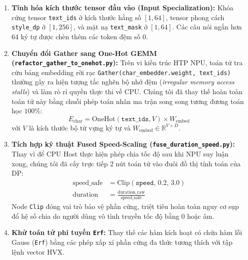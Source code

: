 \documentclass[11pt,a4paper,oneside,table]{report}
\begin{document}
\begin{enumerate}
    \item \textbf{Tĩnh hóa kích thước tensor đầu vào (Input Specialization):}
    Khóa cứng tensor \texttt{text\_ids} ở kích thước hằng số $[1, 64]$, tensor phong cách \texttt{style\_dp} ở $[1, 256]$, và mặt nạ \texttt{text\_mask} ở $[1, 64]$. Các câu nói ngắn hơn 64 ký tự được chèn thêm các token đệm số 0.
    
    \item \textbf{Chuyển đổi Gather sang One-Hot GEMM (\texttt{refactor\_gather\_to\_onehot.py}):}
    Trên vi kiến trúc HTP NPU, toán tử tra cứu bảng embedding rời rạc \texttt{Gather(char\_embedder.weight, text\_ids)} thường gây ra hiện tượng tắc nghẽn bộ nhớ đệm (\textit{irregular memory access stalls}) và làm rò rỉ quyền thực thi về CPU. Chúng tôi đã thay thế hoàn toàn toán tử này bằng chuỗi phép toán nhân ma trận song song tương đương toán học $100\%$:
    \begin{equation}
        E_{\text{char}} = \text{OneHot}(\texttt{text\_ids}, V) \times W_{\text{embed}}
    \end{equation}
    với $V$ là kích thước bộ từ vựng ký tự và $W_{\text{embed}} \in \mathbb{R}^{V \times D}$.
    
    \item \textbf{Tích hợp kỹ thuật Fused Speed-Scaling (\texttt{fuse\_duration\_speed.py}):}
    Thay vì để CPU Host thực hiện phép chia tốc độ sau khi NPU suy luận xong, chúng tôi đã cấy trực tiếp 2 nút toán tử vào đuôi đồ thị tính toán của DP:
    \begin{align}
        \text{speed\_safe} &= \text{Clip}(\texttt{speed}, \, 0.2, \, 3.0) \\
        \text{duration} &= \frac{\text{duration\_raw}}{\text{speed\_safe}}
    \end{align}
    Node \texttt{Clip} đóng vai trò bảo vệ phần cứng, triệt tiêu hoàn toàn nguy cơ sụp đổ hệ số chia do người dùng vô tình truyền tốc độ bằng 0 hoặc âm.
    
    \item \textbf{Khử toán tử phi tuyến \texttt{Erf}:}
    Thay thế các hàm kích hoạt có chứa hàm lỗi Gauss (\texttt{Erf}) bằng các phép xấp xỉ phần cứng đa thức tương thích với tập lệnh vector HVX.
\end{enumerate}
\end{document}
